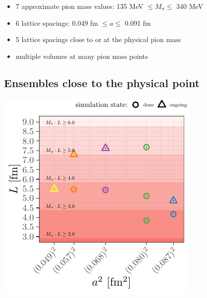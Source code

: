 \documentclass[a0,portrait]{a0poster}
\begin{document}
\begin{multicols}{2}
\begin{center}
    \end{center}
    \begin{itemize}
      \item 7 approximate pion mass values: 135 MeV $\leq M_\pi \leq $ 340 MeV
      \item 6 lattice spacings: 0.049 fm $\leq a \leq$ 0.091 fm
      \item 5 lattice spacings close to or at the physical pion mass
      \item multiple volumes at many pion mass points
    \end{itemize}
    \subsection*{Ensembles close to the physical point}

    \begin{minipage}{0.42\linewidth}
      \begin{center}
        \includegraphics[width=\linewidth]{ensembles_phys_point}
      \end{center}
    \end{minipage}
    \hspace{0.04\linewidth}
    \begin{minipage}{0.52\linewidth}
      \begin{center}

\end{center}
\end{minipage}
\end{multicols}
\end{document}
